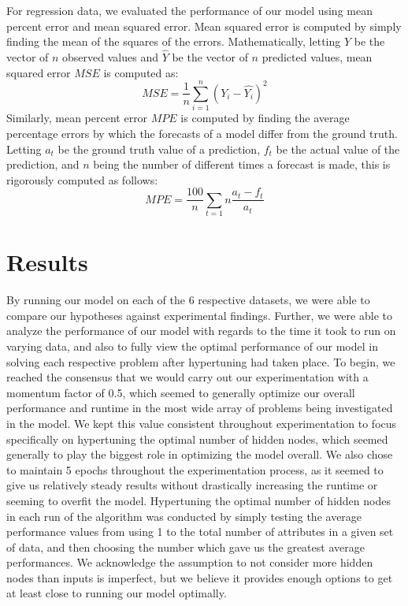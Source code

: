 \documentclass[twoside,11pt]{article}
\begin{document}
For regression data, we evaluated the performance of our model using mean percent error and mean squared error. Mean squared error is computed by
simply finding the mean of the squares of the errors. Mathematically, letting $Y$ be the vector of $n$ observed values and $\hat{Y}$ be the vector of $n$ predicted
values, mean squared error $MSE$ is computed as:
\begin{equation}
MSE = \frac{1}{n} \sum_{i=1}^{n} (Y_i - \hat{Y_i})^2
\end{equation}
Similarly, mean percent error $MPE$ is computed by finding the average percentage errors by which the forecasts of a model differ from the ground truth. Letting $a_t$ be the 
ground truth value of a prediction, $f_t$ be the actual value of the prediction, and $n$ being the number of different times a forecast is made, this is rigorously
computed as follows:
\begin{equation}
MPE = \frac{100}{n} \sum_{t=1}{n} \frac{a_t - f_t}{a_t}
\end{equation}


\section{Results}
By running our model on each of the 6 respective datasets, we were able to compare our hypotheses against experimental findings. Further, we were able
to analyze the performance of our model with regards to the time it took to run on varying data, and also to fully view the optimal performance of our model 
in solving each respective problem after hypertuning had taken place. To begin, we reached the consensus that we would carry out our experimentation
with a momentum factor of 0.5, which seemed to generally optimize our overall performance and runtime in the most wide array of problems being investigated 
in the model. We kept this value consistent throughout experimentation to focus specifically on hypertuning the optimal number of hidden nodes, 
which seemed generally to play the biggest role in optimizing the model overall. We also chose to maintain 5 epochs throughout the experimentation 
process, as it seemed to give us relatively steady results without drastically increasing the runtime or seeming to overfit the model. 
Hypertuning the optimal number of hidden nodes in each run of the algorithm
was conducted by simply testing the average performance values from using 1 to the total number of attributes in a given set of data, and then
choosing the number which gave us the greatest average performances.  We acknowledge the assumption to not consider more hidden nodes than inputs is imperfect,
but we believe it provides enough options to get at least close to running our model optimally.
\end{document}
